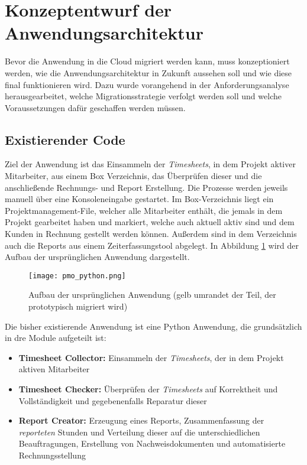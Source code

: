 \section{Konzeptentwurf der Anwendungsarchitektur}
\label{sec:konzeptentwurf}
Bevor die Anwendung in die Cloud migriert werden kann, muss konzeptioniert werden, wie die Anwendungsarchitektur in Zukunft aussehen soll und wie diese final funktionieren wird. Dazu wurde vorangehend in der Anforderungsanalyse herausgearbeitet, welche Migrationsstrategie verfolgt werden soll und welche Voraussetzungen dafür geschaffen werden müssen.

\subsection{Existierender Code}
Ziel der Anwendung ist das Einsammeln der \textit{\glspl{Timesheet}}, in dem Projekt aktiver Mitarbeiter, aus einem \gls{Box} Verzeichnis, das Überprüfen dieser und die anschließende Rechnungs- und Report Erstellung. Die Prozesse werden jeweils manuell über eine Konsoleneingabe gestartet. Im \gls{Box}-Verzeichnis liegt ein Projektmanagement-File, welcher alle Mitarbeiter enthält, die jemals in dem Projekt gearbeitet haben und markiert, welche auch aktuell aktiv sind und dem Kunden in Rechnung gestellt werden können. Außerdem sind in dem Verzeichnis auch die Reports aus einem Zeiterfassungstool abgelegt. In Abbildung \ref{fig:pmo_python} wird der Aufbau der ursprünglichen Anwendung dargestellt.

\begin{figure}[H]
    \centering
    \texttt{[image: pmo\_python.png]}
    \caption{Aufbau der ursprünglichen Anwendung (gelb umrandet der Teil, der prototypisch migriert wird)}
    \label{fig:pmo_python}
\end{figure}

Die bisher existierende Anwendung ist eine Python Anwendung, die grundsätzlich in dre Module aufgeteilt ist:
\begin{itemize}
\item \textbf{Timesheet Collector: }Einsammeln der \textit{\glspl{Timesheet}}, der in dem Projekt aktiven Mitarbeiter
\item \textbf{Timesheet Checker: }Überprüfen der \textit{\glspl{Timesheet}} auf Korrektheit und Vollständigkeit und gegebenenfalls Reparatur dieser
\item \textbf{Report Creator: }Erzeugung eines Reports, Zusammenfassung der \textit{reporteten} Stunden und Verteilung dieser auf die unterschiedlichen Beauftragungen, Erstellung von Nachweisdokumenten und automatisierte Rechnungsstellung
\end{itemize}


